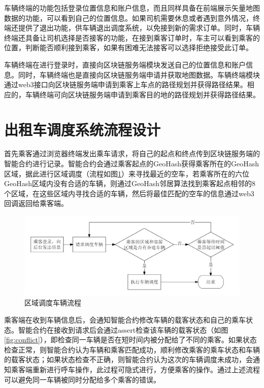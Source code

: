车辆终端的功能包括登录位置信息和账户信息，而且同样具备在前端展示矢量地图数据的功能，可以看到自己的位置信息。如果司机需要休息或者遇到意外情况，终端还提供了退出功能，供车辆退出调度系统，以免接到新的需求订单。同时，车辆终端还具备让司机选择是否接客的功能，在接到乘客订单时，车主可以看到乘客的位置，判断能否顺利接到乘客，如果有困难无法接客可以选择拒绝接受此订单。

车辆终端在进行登录时，直接向区块链服务端模块发送自己的位置信息和账户信息。同时，车辆终端也是直接向区块链服务端申请并获取地图数据。车辆终端模块通过web3接口向区块链服务端申请到乘客上车点的路径规划并获得路径结果。相应的，车辆终端可向区块链服务端申请到乘客目的地的路径规划并获得路径结果。

\section{出租车调度系统流程设计}
首先乘客通过浏览器终端发出乘车请求，将自己的起点和终点传到区块链服务端的智能合约进行记录。智能合约会通过乘客起点的GeoHash获得乘客所在的GeoHash区域，据此进行区域调度（流程如图\ref{fig:region}）来寻找最近的空车，若乘客所在的六位GeoHash区域内没有合适的车辆，则通过GeoHash邻居算法找到乘客起点相邻的8个区域，在这些区域内寻找合适的车辆，然后将最佳匹配的空车的信息通过web3回调返回给乘客端。

\begin{figure}[h]
  \centering
  \includegraphics[width=1.0\textwidth]{figures/区域调度车辆流程}
  \caption{区域调度车辆流程}\label{fig:region}
\end{figure}

乘客端在收到车辆信息后，会通知智能合约修改车辆的载客状态和自己的乘车状态。智能合约在接收到请求后会通过assert检查该车辆的载客状态（如图\ref{fig:conflict}），即检查同一车辆是否在短时间内被分配给了不同的乘客。如果状态检查正常，则智能合约认为车辆和乘客匹配成功，顺利修改乘客的乘车状态和车辆的载客状态；如果状态检查不正确，则智能合约认为这次的车辆调度未成功，会通知乘客端重新进行呼车操作，此过程可隐式进行，方便乘客的操作。通过上述流程可以避免同一车辆被同时分配给多个乘客的错误。

